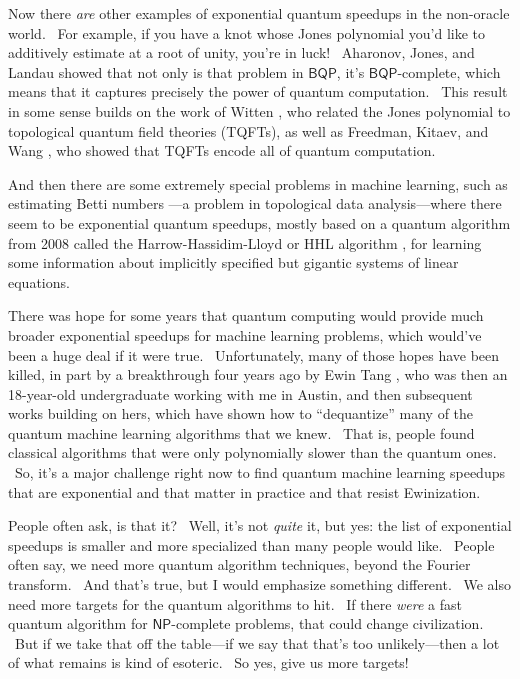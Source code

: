 \documentclass[11pt]{article}
\begin{document}
Now there \emph{are} other examples of exponential quantum speedups in the non-oracle world. \ For example, if you have a knot whose Jones polynomial you'd like to additively estimate at a root of unity, you're in luck! \ Aharonov, Jones, and Landau \cite{ajl} showed that not only is that problem in $\mathsf{BQP}$, it's $\mathsf{BQP}$-complete, which means that it captures precisely the power of quantum computation. \ This result in some sense builds on the work of Witten \cite{witten:jones}, who related the Jones polynomial to topological quantum field theories (TQFTs), as well as Freedman, Kitaev, and Wang \cite{fkw}, who showed that TQFTs encode all of quantum computation.

And then there are some extremely special problems in machine learning, such as estimating Betti numbers \cite{lgz}---a problem in topological data analysis---where there seem to be exponential quantum speedups, mostly based on a quantum algorithm from 2008 called the Harrow-Hassidim-Lloyd or HHL algorithm \cite{hhl}, for learning some information about implicitly specified but gigantic systems of linear equations.

There was hope for some years that quantum computing would provide much broader exponential speedups for machine learning problems, which would've been a huge deal if it were true. \ Unfortunately, many of those hopes have been killed, in part by a breakthrough four years ago by Ewin Tang \cite{tang}, who was then an 18-year-old undergraduate working with me in Austin, and then subsequent works building on hers, which have shown how to ``dequantize'' many of the quantum machine learning algorithms that we knew. \ That is, people found classical algorithms that were only polynomially slower than the quantum ones. \ So, it's a major challenge right now to find quantum machine learning speedups that are exponential and that matter in practice and that resist Ewinization.

People often ask, is that it? \ Well, it's not \emph{quite} it, but yes: the list of exponential speedups is smaller and more specialized than many people would like. \ People often say, we need more quantum algorithm techniques, beyond the Fourier transform. \ And that's true, but I would emphasize something different. \ We also need more targets for the quantum algorithms to hit. \ If there \emph{were} a fast quantum algorithm for $\mathsf{NP}$-complete problems, that could change civilization. \ But if we take that off the table---if we say that that's too unlikely---then a lot of what remains is kind of esoteric. \ So yes, give us more targets!
\end{document}
